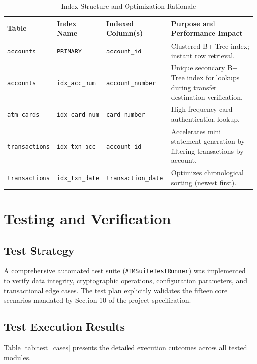 \documentclass[11pt,a4paper]{report}
\begin{document}
\begin{table}[htbp]
    \centering
    \caption{Index Structure and Optimization Rationale}
    \renewcommand{\arraystretch}{1.2}
    \begin{tabular}{|l|l|l|p{6cm}|}
        \hline
        \textbf{Table} & \textbf{Index Name} & \textbf{Indexed Column(s)} & \textbf{Purpose and Performance Impact} \\
        \hline
        \texttt{accounts} & \texttt{PRIMARY} & \texttt{account\_id} & Clustered B+ Tree index; instant row retrieval. \\
        \texttt{accounts} & \texttt{idx\_acc\_num} & \texttt{account\_number} & Unique secondary B+ Tree index for lookups during transfer destination verification. \\
        \texttt{atm\_cards} & \texttt{idx\_card\_num} & \texttt{card\_number} & High-frequency card authentication lookup. \\
        \texttt{transactions} & \texttt{idx\_txn\_acc} & \texttt{account\_id} & Accelerates mini statement generation by filtering transactions by account. \\
        \texttt{transactions} & \texttt{idx\_txn\_date} & \texttt{transaction\_date} & Optimizes chronological sorting (newest first). \\
        \hline
    \end{tabular}
    \label{tab:indexing}
\end{table}

\newpage

\section{Testing and Verification}

\subsection{Test Strategy}
A comprehensive automated test suite (\texttt{ATMSuiteTestRunner}) was implemented to verify data integrity, cryptographic operations, configuration parameters, and transactional edge cases. The test plan explicitly validates the fifteen core scenarios mandated by Section 10 of the project specification.

\subsection{Test Execution Results}
Table \ref{tab:test_cases} presents the detailed execution outcomes across all tested modules.
\end{document}

